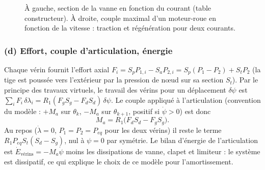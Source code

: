 \documentclass[11pt,a4paper]{article}
\newcommand{\dt}[1]{\dot{#1}}
\begin{document}
\begin{figure}[H]\centering
{}\hfill
{}
\caption{À gauche, section de la vanne en fonction du courant (table constructeur). À droite, couple maximal d'un moteur-roue en fonction de la vitesse : traction et régénération pour deux courants.}\label{fig:vanne}
\end{figure}

\subsubsection*{(d) Effort, couple d'articulation, énergie}
Chaque vérin fournit l'effort axial $F_i=S_pP_{1,i}-S_aP_{2,i}=S_p(P_1-P_2)+S_tP_2$ (la tige est poussée vers l'extérieur par la pression de nœud sur sa section $S_t$). Par le principe des travaux virtuels, le travail des vérins pour un déplacement $\delta\psi$ est $\sum_iF_i\,\delta\lambda_i=R_1(F_gS_g-F_dS_d)\,\delta\psi$. Le couple appliqué à l'articulation (convention du modèle : $+M_a$ sur $\theta_k$, $-M_a$ sur $\theta_{k+1}$, positif si $\dt\psi>0$) est donc
\begin{equation}
 M_a=R_1\big(F_dS_d-F_gS_g\big).
\end{equation}
Au repos ($\dt\lambda=0$, $P_1=P_2=P_{eq}$ pour les deux vérins) il reste le terme $R_1P_{eq}S_t(S_d-S_g)$, nul à $\psi=0$ par symétrie. Le bilan d'énergie de l'articulation est $\dt E_{\text{vérins}}=-M_a\dt\psi$ moins les dissipations de vanne, clapet et limiteur : le système est dissipatif, ce qui explique le choix de ce modèle pour l'amortissement.
\end{document}
